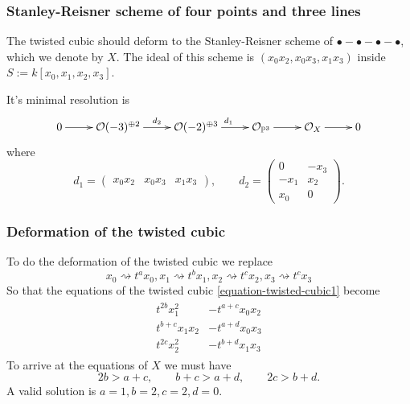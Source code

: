 \medskip\noindent

\subsubsection{Stanley-Reisner scheme of four points and three lines}
\label{subsubsection-Stanley-Reisner-scheme-of-four-points-and-three-lines}

The twisted cubic should deform to the Stanley-Reisner scheme of 
$\bullet-\bullet-\bullet-\bullet$, which we denote by $X$.
 The ideal of this scheme is 
$(x_0x_2,x_0x_3,x_1x_3)$ inside $S:=k[x_0,x_1,x_2,x_3]$.

It's minimal resolution is
\begin{equation}
\label{equation-resolution-of-three-lines}
\xymatrix{
0\ar[r]&\mathcal{O}(-3)^{\oplus 2}\ar[r]^{d_2}&
\mathcal{O}(-2)^{\oplus 3}\ar[r]^{d_1}&
\mathcal{O}_{\mathbb{P}^3}\ar[r]&\mathcal{O}_X\ar[r]&0
}
\end{equation}
where
\begin{equation*}
\label{equation-matrices-three-lines}
d_1=\begin{pmatrix}
x_0x_2&x_0x_3&x_1x_3
\end{pmatrix},\qquad 
d_2=\begin{pmatrix}
0&-x_3\\
-x_1&x_2\\
x_0&0
\end{pmatrix}.
\end{equation*}

\subsubsection{Deformation of the twisted cubic}
\label{subsubsection-deformation-of-twisted-cubic}

To do the deformation of the twisted cubic we replace
$$
x_0\rightsquigarrow t^ax_0,x_1\rightsquigarrow t^bx_1,
x_2\rightsquigarrow t^cx_2,x_3\rightsquigarrow t^cx_3
$$
So that the equations of the twisted cubic \ref{equation-twisted-cubic1} become
\begin{align*}
\label{equation-twisted-cubic2}
\begin{aligned}
t^{2b}x_1^2&-t^{a+c}x_0x_2\\
t^{b+c}x_1x_2&-t^{a+d}x_0x_3\\
t^{2c}x_2^2&-t^{b+d}x_1x_3
\end{aligned}
\end{align*}
To arrive at the equations of $X$ we must have
\begin{equation}
\label{equation-inequalities}
2b>a+c,\qquad b+c>a+d,\qquad 2c>b+d.
\end{equation}
A valid solution is $a=1,b=2,c=2,d=0$.


